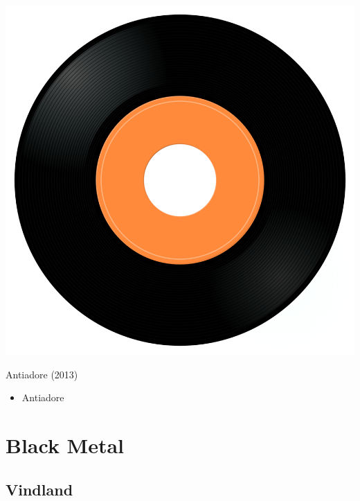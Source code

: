 \begin{minipage}[t]{0.25\textwidth}\vspace{0pt}
\captionsetup{type=figure}
\includegraphics[width=\textwidth]{Images/cover.png}
\caption*{Antiadore (2013)}
\end{minipage}
\begin{minipage}[t]{0.25\textwidth}\vspace{0pt}
\begin{itemize}[nosep,leftmargin=1em,labelwidth=*,align=left]
	\setlength{\itemsep}{0pt}
	\item Antiadore
\end{itemize}
\end{minipage}


\section{Black Metal}

\subsection{Vindland}

